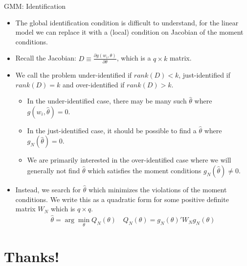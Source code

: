 \documentclass[aspectratio=169]{beamer}
\begin{document}
\begin{frame}{GMM: Identification}

\begin{itemize}
\item The global identification condition is difficult to understand, for the linear model we can replace it with a (local) condition on Jacobian of the moment conditions. 
\item Recall the Jacobian: $D \equiv \frac{\partial g(w_i,\theta)}{\partial \theta}$, which is a $q \times k$ matrix. 
\item We call the problem \alert{under-identified} if $rank(D) < k$, \alert{just-identified} if $rank(D) = k$ and \alert{over-identified} if $rank(D) > k$.
\begin{itemize}
\item In the under-identified case, there may be many such $\hat{\theta}$ where $g(w_i,\hat{\theta}) =0$.
\item In the just-identified case, it should be possible to find a $\hat{\theta}$ where $g_N(\hat{\theta})=0$. 
\item We are primarily interested in the over-identified case where we will generally not find $\hat{\theta}$ which satisfies the moment conditions $g_N(\hat{\theta})\neq0$.
\end{itemize}
\item Instead, we search for $\hat{\theta}$ which minimizes the violations of the moment conditions. We write this as a quadratic form for some positive definite matrix $W_N$ which is $q \times q$.
\begin{eqnarray*}
\hat{\theta} = \arg \min_{\theta}  Q_N(\theta) \quad Q_N(\theta)=g_N(\theta)' W_N  g_N(\theta)
\end{eqnarray*}
\end{itemize}
\end{frame}
\section*{Thanks!}
\end{document}
